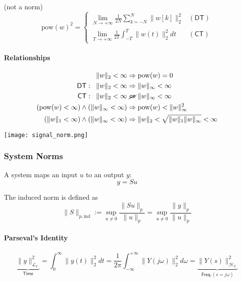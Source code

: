  (not a norm)
\noindent\begin{equation*}
    \mathrm{pow}{(w)}^2=
    \begin{cases}
        \lim\limits_{N\to+\infty}\frac{1}{2N}\sum\limits_{k=-N}^N\|w[k]\|_2^2 & \mathsf{(DT)} \\
        \lim\limits_{T\to+\infty}\frac{1}{2T}\int_{-T}^T\|w(t)\|_2^2 dt       & \mathsf{(CT)}
    \end{cases}
\end{equation*}

\paragraph{Relationships}
\noindent\begin{align*}
    \|w\|_2<\infty                                         & \Rightarrow \mathrm{pow}{(w)}=0                         \\
    \mathsf{DT}:\;\;\|w\|_2<\infty                         & \Rightarrow \|w\|_\infty<\infty                         \\
    \mathsf{CT}:\;\;\|w\|_2<\infty                         & \;\cancel{\Leftrightarrow}\; \|w\|_\infty<\infty        \\
    (\mathrm{pow}{(w)}<\infty) \land (\|w\|_\infty<\infty) & \Rightarrow \mathrm{pow}{(w)} < \|w\|_\infty^2          \\
    (\|w\|_1<\infty) \land (\|w\|_\infty<\infty)           & \Rightarrow \|w\|_2<\sqrt{\|w\|_1\|w\|_\infty} < \infty
\end{align*}

\begin{center}
    \texttt{[image: signal\_norm.png]}
\end{center}

\newpar{}
\subsubsection{System Norms}
A system maps an input $u$ to an output $y$:
\noindent\begin{equation*}
    y=Su
\end{equation*}

The induced norm is defined as
\noindent\begin{equation*}
    \|S\|_{p,\mathrm{ind}}:=\sup_{u\neq0}\frac{\|Su\|_p}{\|u\|_p}=\sup_{u\neq0}\frac{\|y\|_p}{\|u\|_p}
\end{equation*}

\newpar{}
\paragraph{Parseval's Identity}
\noindent\begin{equation*}
    \underbrace{\|y\|_{\mathcal{L}_2}^2}_{\textsf{Time}}=\int_0^\infty\|y(t)\|_2^2 dt=\frac1{2\pi}\int_{-\infty}^{+\infty}\|Y(j\omega)\|_2^2 d\omega=\underbrace{\|Y(s)\|_{\mathcal{H}_2}^2}_{\textsf{Freq.} (s=j\omega)}
\end{equation*}

